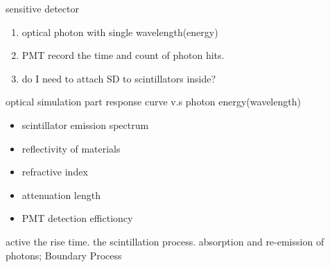\documentclass[11pt,compress,xcolor=x11names,UTF8]{beamer}
\begin{document}
\begin{frame}{sensitive detector}
\begin{enumerate}
	\item optical photon with single wavelength(energy)
	\item PMT record the time and count of photon hits.
	\item  do I need to attach SD to scintillators inside?
\end{enumerate}
\end{frame}

\begin{frame}{optical simulation part}
	response curve v.s photon energy(wavelength)
	\begin{itemize}
		\item scintillator emission spectrum
		\item reflectivity of materials
		\item refractive index
		\item attenuation length
		\item PMT detection effictioncy
	\end{itemize}
	active the rise time. the scintillation process.
	 absorption and re-emission of photons; Boundary Process
\end{frame}
\end{document}
